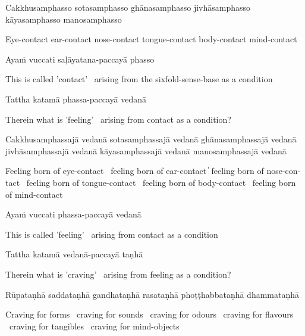 Cakkhusamphasso sotasamphasso ghānasamphasso jivhāsamphasso kāyasamphasso manosamphasso

\begin{english}
  Eye-contact ear-contact nose-contact tongue-contact body-contact mind-contact
\end{english}

Ayaṁ vuccati saḷāyatana-paccayā phasso

\begin{english}
  This is called 'contact' \breathmark\ arising from the sixfold-sense-base as a condition
\end{english}

Tattha katamā phassa-paccayā vedanā

\begin{english}
  Therein what is 'feeling' \breathmark\ arising from contact as a condition?
\end{english}

Cakkhusamphassajā vedanā sotasamphassajā vedanā ghānasamphassajā vedanā jivhāsamphassajā vedanā kāyasamphassajā vedanā manosamphassajā vedanā

\begin{english}
  Feeling born of eye-contact \breathmark\ feeling born of ear-contact  ̓
  feeling born of nose-contact \breathmark\ feeling born of tongue-contact \breathmark\ feeling born of body-contact \breathmark\ feeling born of mind-contact
\end{english}

Ayaṁ vuccati phassa-paccayā vedanā

\begin{english}
  This is called 'feeling' \breathmark\ arising from contact as a condition
\end{english}

Tattha katamā vedanā-paccayā taṇhā

\begin{english}
  Therein what is 'craving' \breathmark\ arising from feeling as a condition?
\end{english}

Rūpataṇhā saddataṇhā gandhataṇhā rasataṇhā phoṭṭhabbataṇhā dhammataṇhā

\begin{english}
  Craving for forms \breathmark\ craving for sounds \breathmark\ craving for odours \breathmark\ craving for flavours \breathmark\ craving for tangibles \breathmark\ craving for mind-objects
\end{english}

